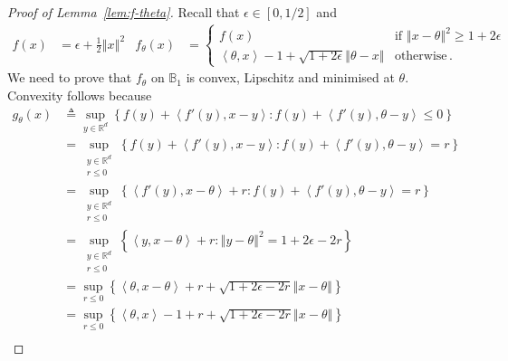 \documentclass[letter, 12pt]{report}
\newcommand{\R}{\mathbb R}
\newcommand{\ip}[1]{\left \langle #1 \right \rangle}
\newcommand{\ball}{\mathbb{B}}
\newcommand{\norm}[1]{\left \Vert  #1 \right \Vert}
\newcommand{\1}{\mathbf{1}}
\theoremstyle{plain}
\theoremstyle{definition}
\theoremstyle{remark}
\begin{document}
\begin{proof}[Proof of Lemma~\ref{lem:f-theta}] \label{app:proof:f-theta}
    Recall that $\epsilon \in [0,1/2]$ and
    \begin{align*}
        f(x)        & = \epsilon + \frac{1}{2} \norm{x}^2                                                                                 &
        f_\theta(x) & = \begin{cases}
                            f(x)                                                         & \text{if } \norm{x - \theta}^2 \geq 1 + 2\epsilon \\
                            \ip{\theta, x} - 1 + \sqrt{1 + 2 \epsilon} \norm{\theta - x} & \text{otherwise} \,.
                        \end{cases}
    \end{align*}
    We need to prove that $f_\theta$ on $\ball_1$ is convex, Lipschitz and minimised at $\theta$.
    Convexity follows because
    \begin{align}
        g_\theta(x)
         & \triangleq \sup_{y \in \R^d} \left\{ f(y) + \ip{f'(y), x - y} : f(y) + \ip{f'(y), \theta - y} \leq 0\right\}  \nonumber                \\
         & = \sup_{\substack{y \in \R^d                                                                                                           \\ r \leq 0}} \left\{ f(y) + \ip{f'(y), x - y} : f(y) + \ip{f'(y), \theta - y} = r \right\} \nonumber\\
         & = \sup_{\substack{y \in \R^d                                                                                                           \\ r \leq 0}} \left\{ \ip{f'(y), x - \theta} + r : f(y) + \ip{f'(y), \theta - y} = r \right\} \nonumber\\
         & = \sup_{\substack{y \in \R^d                                                                                                           \\ r \leq 0}} \left\{  \ip{y, x - \theta} + r : \norm{y - \theta}^2 = 1 + 2\epsilon - 2r \right\} \nonumber\\
         & = \sup_{r \leq 0} \left\{  \ip{\theta, x - \theta} + r + \sqrt{1 + 2\epsilon - 2r} \norm{x - \theta} \right\} \nonumber                \\
         & = \sup_{r \leq 0} \left\{  \ip{\theta, x} - 1 + r + \sqrt{1 + 2\epsilon - 2r} \norm{x - \theta} \right\}      \label{eq:f-lower-bound} \\

\end{align}
\end{proof}
\end{document}
